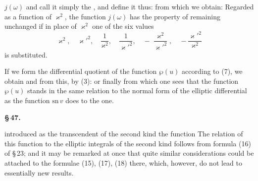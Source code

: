 $j(\omega)$ and call it simply the , and define it thus:
from which we obtain:
Regarded as a function of $\varkappa^2$, the function $j(\omega)$ has the property of
remaining unchanged if in place of $\varkappa^2$ one of the six values
\[ \varkappa^2, \quad \varkappa'^2, \quad \frac{1}{\varkappa^2}, \quad \frac{1}{\varkappa'^2}, \quad -\frac{\varkappa^2}{\varkappa'^2}, \quad -\frac{\varkappa'^2}{\varkappa^2} \]
is substituted.

If we form the differential quotient of the function $\wp(u)$ according to (7), we obtain
and from this, by (3):
or finally
from which one sees that the function $\wp(u)$ stands in the same relation to the
 normal form of the elliptic differential as the function
$\mathrm{sn}\,v$ does to the  one.

\begin{center}
\textbf{§\,47. }
\end{center}

 introduced as the transcendent of the second kind the function
The relation of this function to the elliptic integrals of the second kind follows from
formula (16) of §\,23; and it may be remarked at once that quite similar considerations
could be attached to the formulae (15), (17), (18) there, which, however, do not lead to
essentially new results.
